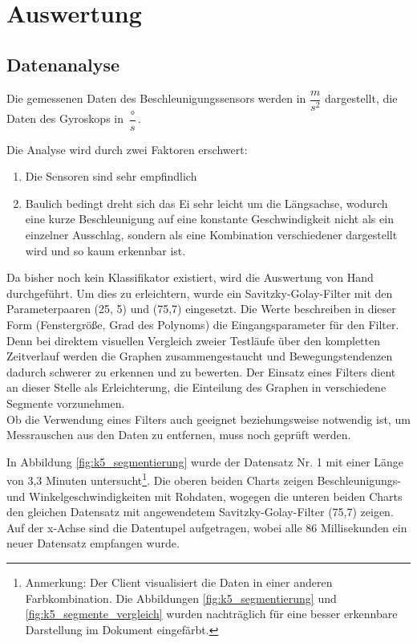 \section{Auswertung}

\subsection{Datenanalyse}
Die gemessenen Daten des Beschleunigungssensors werden in $\dfrac{m}{s^{2}}$ 
dargestellt, die Daten des Gyroskops in $\dfrac{\circ}{s}$.

Die Analyse wird durch zwei Faktoren erschwert:
\begin{enumerate}
	\item Die Sensoren sind sehr empfindlich
	\item Baulich bedingt dreht sich das Ei sehr leicht um die Längsachse, wodurch eine kurze Beschleunigung auf eine konstante Geschwindigkeit nicht als ein einzelner Ausschlag, sondern als eine Kombination verschiedener dargestellt wird und so kaum erkennbar ist.
\end{enumerate}

Da bisher noch kein Klassifikator existiert, wird die Auswertung von Hand durchgeführt. Um dies zu erleichtern, wurde ein Savitzky-Golay-Filter mit den Parameterpaaren (25, 5) und (75,7) eingesetzt. Die Werte beschreiben in dieser Form (Fenstergröße, Grad des Polynoms) die Eingangsparameter für den Filter. Denn bei direktem visuellen Vergleich zweier Testläufe über den kompletten Zeitverlauf werden die Graphen zusammengestaucht und Bewegungstendenzen dadurch schwerer zu erkennen und zu bewerten. Der Einsatz eines Filters dient an dieser Stelle als Erleichterung, die Einteilung des Graphen in verschiedene Segmente vorzunehmen. \\
Ob die Verwendung eines Filters auch geeignet beziehungsweise notwendig ist, um Messrauschen aus den Daten zu entfernen, muss noch geprüft werden.

In Abbildung \ref{fig:k5_segmentierung} wurde der Datensatz Nr. 1 mit einer Länge von 3,3 Minuten untersucht\footnote{Anmerkung: Der Client visualisiert die Daten in einer anderen Farbkombination. Die Abbildungen \ref{fig:k5_segmentierung} und \ref{fig:k5_segmente_vergleich} wurden nachträglich für eine besser erkennbare Darstellung im Dokument eingefärbt.}. Die oberen beiden Charts zeigen Beschleunigungs- und Winkelgeschwindigkeiten mit Rohdaten, wogegen die unteren beiden Charts den gleichen Datensatz mit angewendetem Savitzky-Golay-Filter (75,7) zeigen. Auf der x-Achse sind die Datentupel aufgetragen, wobei alle 86 Millisekunden ein neuer Datensatz empfangen wurde.

